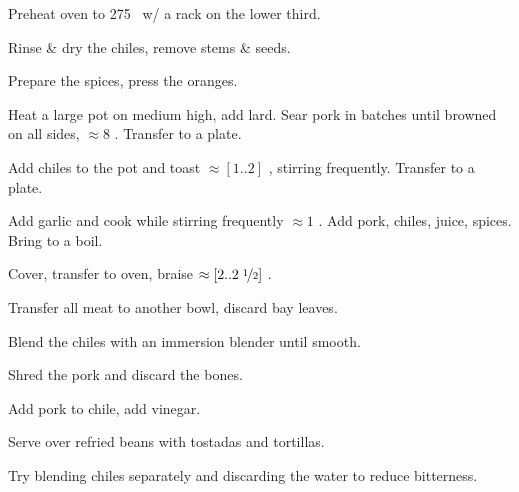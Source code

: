 \begin{preparation}
	\item Preheat oven to 275 \Fahrenheit\ w/ a rack on the lower third.
	\item Rinse \& dry the chiles, remove stems \& seeds.
	\item Prepare the spices, press the oranges.
	\item Heat a large pot on medium high, add lard.
		Sear pork in batches until browned on all sides, $\approx8$ \minute.
		Transfer to a plate.
	\item Add chiles to the pot and toast $\approx[1..2]$ \minute, stirring frequently.
		Transfer to a plate.
	\item Add garlic and cook while stirring frequently $\approx1$ \minute.
		Add pork, chiles, juice, spices.
		Bring to a boil.
	\item Cover, transfer to oven, braise $\approx[2..2\;\nicefrac{1}{2}]$ \hour.
	\item Transfer all meat to another bowl, discard bay leaves.
	\item Blend the chiles with an immersion blender until smooth.
	\item Shred the pork and discard the bones.
	\item Add pork to chile, add vinegar.
	\item Serve over refried beans with tostadas and tortillas.
\end{preparation}


\begin{experiments}
	\item Try blending chiles separately and discarding the water to reduce bitterness.
\end{experiments}
\recipeend%
